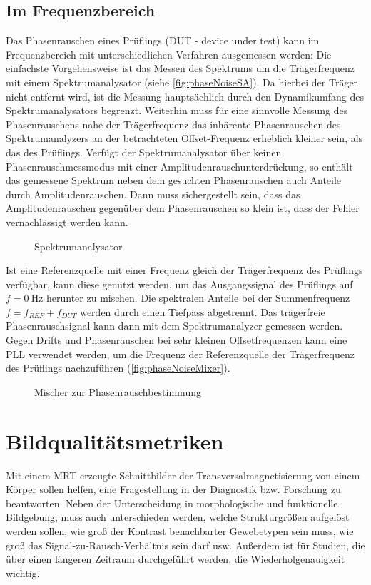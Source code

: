 \subsection{Im Frequenzbereich}
Das Phasenrauschen eines Prüflings (DUT - device under test) kann im Frequenzbereich mit unterschiedlichen Verfahren ausgemessen werden: Die einfachste Vorgehensweise ist das Messen des Spektrums um die Trägerfrequenz mit einem Spektrumanalysator (siehe \autoref{fig:phaseNoiseSA}).
Da hierbei der Träger nicht entfernt wird, ist die Messung hauptsächlich durch den Dynamikumfang des Spektrumanalysators begrenzt. Weiterhin muss für eine sinnvolle Messung des Phasenrauschens nahe der Trägerfrequenz das inhärente Phasenrauschen des Spektrumanalyzers an der betrachteten Offset-Frequenz erheblich kleiner sein, als das des Prüflings. Verfügt der Spektrumanalysator über keinen Phasenrauschmessmodus mit einer Amplitudenrauschunterdrückung, so enthält das gemessene Spektrum neben dem gesuchten Phasenrauschen auch Anteile durch Amplitudenrauschen. Dann muss sichergestellt sein, dass das Amplitudenrauschen gegenüber dem Phasenrauschen so klein ist, dass der Fehler vernachlässigt werden kann. 

\begin{figure}[H]
	\centering
	\caption[Spektrumanalysator]{Spektrumanalysator}
	\label{fig:phaseNoiseSA}
\end{figure}

Ist eine Referenzquelle mit einer Frequenz gleich der Trägerfrequenz des Prüflings verfügbar, kann diese genutzt werden, um das Ausgangssignal des Prüflings auf $f=\SI{0}{\hertz}$ herunter zu mischen. Die spektralen Anteile bei der Summenfrequenz $f=f_{REF}+f_{DUT}$ werden durch einen Tiefpass abgetrennt. Das trägerfreie Phasenrauschsignal kann dann mit dem Spektrumanalyzer gemessen werden.
Gegen Drifts und Phasenrauschen bei sehr kleinen Offsetfrequenzen kann eine PLL verwendet werden, um die Frequenz der Referenzquelle der Trägerfrequenz des Prüflings nachzuführen (\autoref{fig:phaseNoiseMixer}).

\begin{figure}[H]
	\centering
	\caption[Mischer zur Phasenrauschmessung]{Mischer zur Phasenrauschbestimmung}
	\label{fig:phaseNoiseMixer}
\end{figure}

\section{Bildqualitätsmetriken}
Mit einem MRT erzeugte Schnittbilder der Transversalmagnetisierung von einem Körper sollen helfen, eine Fragestellung in der Diagnostik bzw. Forschung zu beantworten. Neben der Unterscheidung in morphologische und funktionelle Bildgebung, muss auch unterschieden werden, welche Strukturgrößen aufgelöst werden sollen, wie groß der Kontrast benachbarter Gewebetypen sein muss, wie groß das Signal-zu-Rausch-Verhältnis sein darf usw. Außerdem ist für Studien, die über einen längeren Zeitraum durchgeführt werden, die Wiederholgenauigkeit wichtig.


